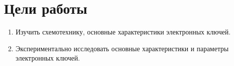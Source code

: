 \section{Цели работы}


\begin{enumerate}

\item
Изучить схемотехнику, основные характеристики электронных ключей. 

\item
Экспериментально исследовать основные характеристики и параметры электронных ключей.

\end{enumerate}